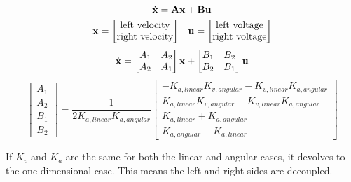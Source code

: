 \begin{theorem}
  \begin{equation*}
    \dot{\mathbf{x}} = \mathbf{A}\mathbf{x} + \mathbf{B}\mathbf{u}
  \end{equation*}
  \begin{equation*}
    \begin{array}{cc}
    \mathbf{x} =
      \begin{bmatrix}
        \text{left velocity} \\
        \text{right velocity}
      \end{bmatrix} &
    \mathbf{u} =
      \begin{bmatrix}
        \text{left voltage} \\
        \text{right voltage}
      \end{bmatrix}
    \end{array}
  \end{equation*}
  \begin{equation*}
    \dot{\mathbf{x}} =
      \begin{bmatrix}
        A_1 & A_2 \\
        A_2 & A_1
      \end{bmatrix} \mathbf{x} +
      \begin{bmatrix}
        B_1 & B_2 \\
        B_2 & B_1
      \end{bmatrix} \mathbf{u}
  \end{equation*}
  \begin{equation}
    \begin{bmatrix}
      A_1 \\
      A_2 \\
      B_1 \\
      B_2
    \end{bmatrix} = \frac{1}{2 K_{a,linear} K_{a,angular}}
      \begin{bmatrix}
        -K_{a,linear} K_{v,angular} - K_{v,linear} K_{a,angular} \\
        K_{a,linear} K_{v,angular} - K_{v,linear} K_{a,angular} \\
        K_{a,linear} + K_{a,angular} \\
        K_{a,angular} - K_{a,linear}
      \end{bmatrix}
  \end{equation}
\end{theorem}

If $K_v$ and $K_a$ are the same for both the linear and angular cases, it devolves to the one-dimensional case. This means the left and right sides are decoupled.

